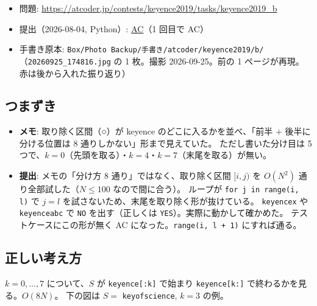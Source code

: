 \documentclass[a4paper]{article}
\begin{document}
\begin{itemize}
  \item 問題: \url{https://atcoder.jp/contests/keyence2019/tasks/keyence2019_b}
  \item 提出（2026-08-04, Python）:
    \href{https://atcoder.jp/contests/keyence2019/submissions/78117551}{AC}（1 回目で AC）
  \item 手書き原本: \texttt{Box/Photo Backup/手書き/atcoder/keyence2019/b/}（\texttt{20260925\_174816.jpg} の 1 枚。撮影 2026-09-25。前の 1 ページが再現。赤は後から入れた振り返り）
\end{itemize}

\subsection*{つまずき}
\begin{itemize}
  \item \textbf{メモ}: 取り除く区間（○）が keyence のどこに入るかを並べ、「前半 $+$ 後半に分ける位置は 8 通りしかない」形まで見えていた。
    ただし書いた分け目は 5 つで、$k=0$（先頭を取る）・$k=4$・$k=7$（末尾を取る）が無い。
  \item \textbf{提出}: メモの「分け方 8 通り」ではなく、取り除く区間 $[i,j)$ を $O(N^2)$ 通り全部試した（$N \leq 100$ なので間に合う）。
    ループが \verb|for j in range(i, l)| で $j = l$ を試さないため、末尾を取り除く形が抜けている。
    \verb|keyencex| や \verb|keyenceabc| で \verb|NO| を出す（正しくは \verb|YES|）。実際に動かして確かめた。
    テストケースにこの形が無く AC になった。\verb|range(i, l + 1)| にすれば通る。
\end{itemize}

\subsection*{正しい考え方}
$k = 0, \dots, 7$ について、$S$ が \verb|keyence[:k]| で始まり \verb|keyence[k:]| で終わるかを見る。$O(8N)$。
下の図は $S=$ \texttt{keyofscience}, $k=3$ の例。

\begin{center}
\end{center}
\end{document}
